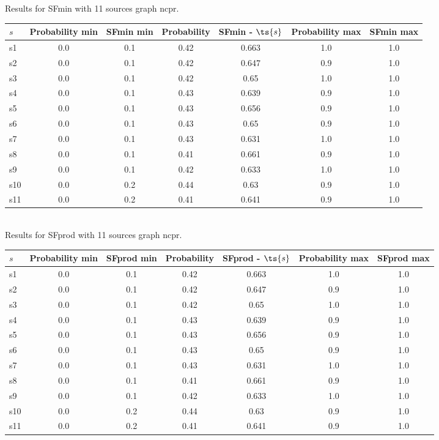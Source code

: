 \documentclass{article}
\begin{document}
\noindent Results for SFmin with 11 sources graph ncpr.

\noindent\begin{tabular}{|l|c|c|c|c|c|c|}
\hline
$s$& Probability min & SFmin min & Probability & SFmin - $\ts{s}$ & Probability max & SFmin max\\
\hline
s1 &0.0 & 0.1 & 0.42 & 0.663 & 1.0 & 1.0\\
\hline
s2 &0.0 & 0.1 & 0.42 & 0.647 & 0.9 & 1.0\\
\hline
s3 &0.0 & 0.1 & 0.42 & 0.65 & 1.0 & 1.0\\
\hline
s4 &0.0 & 0.1 & 0.43 & 0.639 & 0.9 & 1.0\\
\hline
s5 &0.0 & 0.1 & 0.43 & 0.656 & 0.9 & 1.0\\
\hline
s6 &0.0 & 0.1 & 0.43 & 0.65 & 0.9 & 1.0\\
\hline
s7 &0.0 & 0.1 & 0.43 & 0.631 & 1.0 & 1.0\\
\hline
s8 &0.0 & 0.1 & 0.41 & 0.661 & 0.9 & 1.0\\
\hline
s9 &0.0 & 0.1 & 0.42 & 0.633 & 1.0 & 1.0\\
\hline
s10 &0.0 & 0.2 & 0.44 & 0.63 & 0.9 & 1.0\\
\hline
s11 &0.0 & 0.2 & 0.41 & 0.641 & 0.9 & 1.0\\
\hline
\end{tabular}\\

\noindent Results for SFprod with 11 sources graph ncpr.

\noindent\begin{tabular}{|l|c|c|c|c|c|c|}
\hline
$s$& Probability min & SFprod min & Probability & SFprod - $\ts{s}$ & Probability max & SFprod max\\
\hline
s1 &0.0 & 0.1 & 0.42 & 0.663 & 1.0 & 1.0\\
\hline
s2 &0.0 & 0.1 & 0.42 & 0.647 & 0.9 & 1.0\\
\hline
s3 &0.0 & 0.1 & 0.42 & 0.65 & 1.0 & 1.0\\
\hline
s4 &0.0 & 0.1 & 0.43 & 0.639 & 0.9 & 1.0\\
\hline
s5 &0.0 & 0.1 & 0.43 & 0.656 & 0.9 & 1.0\\
\hline
s6 &0.0 & 0.1 & 0.43 & 0.65 & 0.9 & 1.0\\
\hline
s7 &0.0 & 0.1 & 0.43 & 0.631 & 1.0 & 1.0\\
\hline
s8 &0.0 & 0.1 & 0.41 & 0.661 & 0.9 & 1.0\\
\hline
s9 &0.0 & 0.1 & 0.42 & 0.633 & 1.0 & 1.0\\
\hline
s10 &0.0 & 0.2 & 0.44 & 0.63 & 0.9 & 1.0\\
\hline
s11 &0.0 & 0.2 & 0.41 & 0.641 & 0.9 & 1.0\\
\hline
\end{tabular}\\
\end{document}
